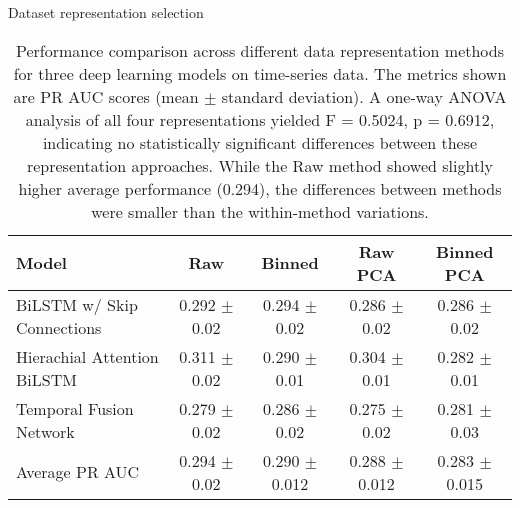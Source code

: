 \documentclass{article}
\begin{document}
\begin{table}[htbp]
    \centering
    \caption{Dataset representation selection}
    \begin{tabular}{l|cccc}
        \hline
        Model                       & Raw              & Binned            & Raw PCA           & Binned PCA         \\
        \hline
        BiLSTM w/ Skip Connections  & 0.292 $\pm$ 0.02 & 0.294 $\pm$ 0.02  & 0.286 $\pm$ 0.02  & 0.286 $\pm$ 0.02   \\
        Hierachial Attention BiLSTM & 0.311 $\pm$ 0.02 & 0.290 $\pm$ 0.01  & 0.304 $\pm$ 0.01  & 0.282   $\pm$ 0.01 \\
        Temporal Fusion Network     & 0.279 $\pm$ 0.02 & 0.286 $\pm$ 0.02  & 0.275 $\pm$ 0.02  & 0.281 $\pm$ 0.03   \\
        \hline
        Average PR AUC              & 0.294 $\pm$ 0.02 & 0.290 $\pm$ 0.012 & 0.288 $\pm$ 0.012 & 0.283 $\pm$ 0.015  \\
        \hline
    \end{tabular}
    \caption*{
        Performance comparison across different data representation methods for three deep learning models on time-series data.
        The metrics shown are PR AUC scores (mean $\pm$ standard deviation).
        A one-way ANOVA analysis of all four representations yielded F = 0.5024, p = 0.6912,
        indicating no statistically significant differences between these representation approaches.
        While the Raw method showed slightly higher average performance (0.294),
        the differences between methods were smaller than the within-method variations.
    }
    \label{tab:dataset-representation}
\end{table}
\end{document}
